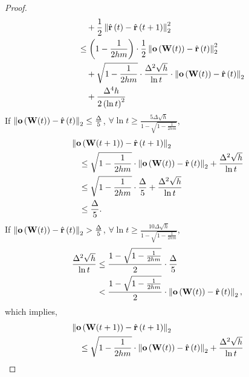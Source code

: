 \begin{proof}
\begin{equation*}
\begin{split}
	&\qquad + \frac{1}{2} \left\| \hat{{\mathbf{r}}}\left(t\right) - \hat{{\mathbf{r}}}\left(t+1\right) \right\|_2^2 \\
	&\quad \le \left( 1 - \frac{1}{2 h m } \right) \cdot \frac{1}{2} \left\| {\mathbf{o}}\left( {\mathbf{W}}(t) \right) - \hat{{\mathbf{r}}}\left(t\right)\right\|_2^2 \\
	&\qquad + \sqrt{1 - \frac{1}{2 h m } } \cdot \frac{\Delta^2 \sqrt{h}}{\ln{t}} \cdot \left\| {\mathbf{o}}\left( {\mathbf{W}}(t) \right) - \hat{{\mathbf{r}}}\left(t\right)\right\|_2 \\
	&\qquad + \frac{\Delta^4 h}{2 \left( \ln{t} \right)^2 }
	\end{split}
	\end{equation*}
	If $\left\| {\mathbf{o}}\left( {\mathbf{W}}(t) \right) - \hat{{\mathbf{r}}}\left(t\right)\right\|_2 \le \frac{\Delta}{5}$, $\forall \ln{t} \ge \frac{5 \Delta \sqrt{h}}{1 - \sqrt{1 - \frac{1}{2 h m}}}$,
	\begin{equation*}
	\begin{split}
	&\left\| {\mathbf{o}}\left( {\mathbf{W}}(t+1) \right) - \hat{{\mathbf{r}}}\left(t+1\right)\right\|_2 \\
	&\quad \le \sqrt{1 - \frac{1}{2 h m}} \cdot \left\| {\mathbf{o}}\left( {\mathbf{W}}(t) \right) - \hat{{\mathbf{r}}}\left(t\right)\right\|_2 + \frac{\Delta^2 \sqrt{h}}{\ln{t}} \\
	&\quad \le \sqrt{1 - \frac{1}{2 h m}} \cdot \frac{\Delta}{5} + \frac{\Delta^2 \sqrt{h}}{\ln{t}} \\
	&\quad \le \frac{\Delta}{5}.
	\end{split}
	\end{equation*}
	If $\left\| {\mathbf{o}}\left( {\mathbf{W}}(t) \right) - \hat{{\mathbf{r}}}\left(t\right)\right\|_2 > \frac{\Delta}{5}$, $\forall \ln{t} \ge \frac{10 \Delta \sqrt{h}}{1 - \sqrt{1 - \frac{1}{2 h m}}}$,
	\begin{equation*}
	\begin{split}
	\frac{\Delta^2 \sqrt{h}}{\ln{t}} &\le \frac{1 - \sqrt{1 - \frac{1}{2 h m}}}{2} \cdot \frac{\Delta}{5} \\
	&< \frac{1 - \sqrt{1 - \frac{1}{2 h m}}}{2} \cdot \left\| {\mathbf{o}}\left( {\mathbf{W}}(t) \right) - \hat{{\mathbf{r}}}\left(t\right)\right\|_2,
	\end{split}
	\end{equation*}
	which implies,
	\begin{equation*}
	\begin{split}
	&\left\| \rvo\left( \rmW(t+1) \right) - \hat{\rvr}\left(t+1\right)\right\|_2 \\
	&\quad \le \sqrt{1 - \frac{1}{2 h m}} \cdot \left\| \rvo\left( \rmW(t) \right) - \hat{\rvr}\left(t\right)\right\|_2 + \frac{\Delta^2 \sqrt{h}}{\ln{t}} \\

\end{split}
\end{equation*}
\end{proof}
